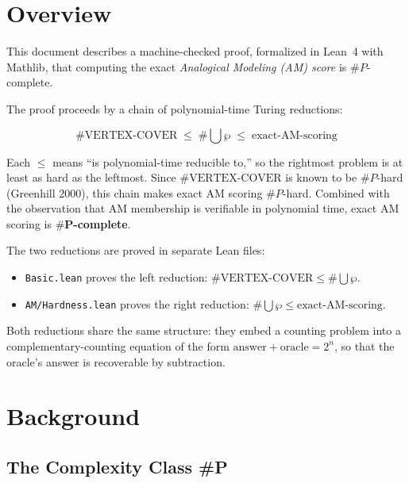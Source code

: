
\tableofcontents

\chapter{Overview}

This document describes a machine-checked proof, formalized in Lean~4 with
Mathlib, that computing the exact \emph{Analogical Modeling (AM) score} is
$\#P$-complete.

The proof proceeds by a chain of polynomial-time Turing reductions:

\[
  \#\text{VERTEX-COVER} \;\leq\; \#\bigcup\wp \;\leq\; \text{exact-AM-scoring}
\]

Each $\leq$ means ``is polynomial-time reducible to,'' so the rightmost problem
is at least as hard as the leftmost.  Since $\#\text{VERTEX-COVER}$ is known to
be $\#P$-hard (Greenhill 2000), this chain makes exact AM scoring $\#P$-hard.
Combined with the observation that AM membership is verifiable in polynomial
time, exact AM scoring is $\mathbf{\#P}$\textbf{-complete}.

The two reductions are proved in separate Lean files:
\begin{itemize}
  \item \texttt{Basic.lean} proves the left reduction:
        $\#\text{VERTEX-COVER} \leq \#\bigcup\wp$.
  \item \texttt{AM/Hardness.lean} proves the right reduction:
        $\#\bigcup\wp \leq \text{exact-AM-scoring}$.
\end{itemize}

Both reductions share the same structure: they embed a counting problem into a
complementary-counting equation of the form $\text{answer} + \text{oracle} =
2^n$, so that the oracle's answer is recoverable by subtraction.

\chapter{Background}

\section{The Complexity Class \#P}

